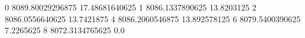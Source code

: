 0 8089.80029296875 17.48681640625
1 8086.1337890625 13.8203125
2 8086.0556640625 13.7421875
4 8086.2060546875 13.892578125
6 8079.5400390625 7.2265625
8 8072.3134765625 0.0
